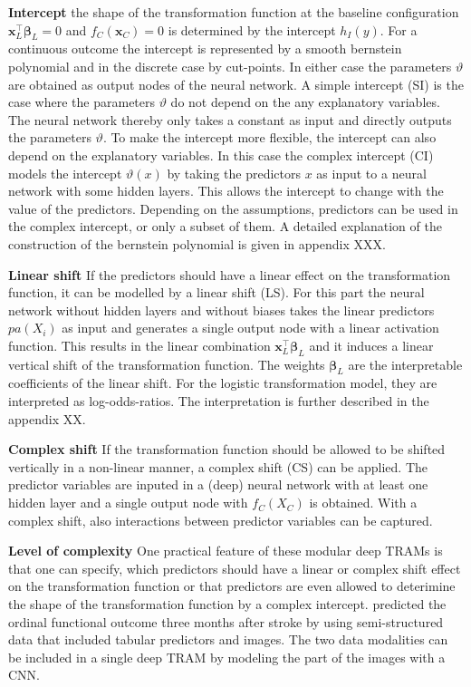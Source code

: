 \textbf{Intercept } the shape of the transformation function at the baseline configuration $\mathbf{x}_L^\top \boldsymbol{\beta}_L = 0$ and $f_C(\mathbf{x}_C)=0$ is determined by the intercept $h_I(y)$. For a continuous outcome the intercept is represented by a smooth bernstein polynomial and in the discrete case by cut-points. In either case the parameters $\vartheta$ are obtained as output nodes of the neural network. A simple intercept (SI) is the case where the parameters $\vartheta$ do not depend on the any explanatory variables. The neural network thereby only takes a constant as input and directly outputs the parameters $\vartheta$. To make the intercept more flexible, the intercept can also depend on the explanatory variables. In this case the complex intercept (CI) models the intercept $\vartheta(x)$ by taking the predictors $x$ as input to a neural network with some hidden layers. This allows the intercept to change with the value of the predictors. Depending on the assumptions, predictors can be used in the complex intercept, or only a subset of them. A detailed explanation of the construction of the bernstein polynomial is given in appendix XXX.

\textbf{Linear shift } If the predictors should have a linear effect on the transformation function, it can be modelled by a linear shift (LS). For this part the neural network without hidden layers and without biases takes the linear predictors $pa(X_i)$ as input and generates a single output node with a linear activation function. This results in the linear combination $\mathbf{x}_L^\top \boldsymbol{\beta}_L$ and it induces a linear vertical shift of the transformation function. The weights $\boldsymbol{\beta}_L$ are the interpretable coefficients of the linear shift. For the logistic transformation model, they are interpreted as log-odds-ratios.
The interpretation is further described in the appendix XX.

\textbf{Complex shift } If the transformation function should be allowed to be shifted vertically in a non-linear manner, a complex shift (CS) can be applied. The predictor variables are inputed in a (deep) neural network with at least one hidden layer and a single output node with $f_C(X_C)$ is obtained. With a complex shift, also interactions between predictor variables can be captured.


\textbf{Level of complexity } One practical feature of these modular deep TRAMs is that one can specify, which predictors should have a linear or complex shift effect on the transformation function or that predictors are even allowed to deterimine the shape of the transformation function by a complex intercept. \citet{herzog2023} predicted the ordinal functional outcome three months after stroke by using semi-structured data that included tabular predictors and images. The two data modalities can be included in a single deep TRAM by modeling the part of the images with a CNN.

